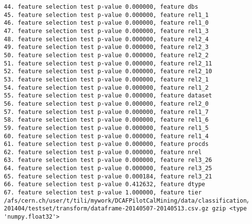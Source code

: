 \begin{verbatim}
44. feature selection test p-value 0.000000, feature dbs
45. feature selection test p-value 0.000000, feature rel1_1
46. feature selection test p-value 0.000000, feature rel1_0
47. feature selection test p-value 0.000000, feature rel1_3
48. feature selection test p-value 0.000000, feature rel2_4
49. feature selection test p-value 0.000000, feature rel2_3
50. feature selection test p-value 0.000000, feature rel2_2
51. feature selection test p-value 0.000000, feature rel2_11
52. feature selection test p-value 0.000000, feature rel2_10
53. feature selection test p-value 0.000000, feature rel2_1
54. feature selection test p-value 0.000000, feature rel1_2
55. feature selection test p-value 0.000000, feature dataset
56. feature selection test p-value 0.000000, feature rel2_0
57. feature selection test p-value 0.000000, feature rel1_7
58. feature selection test p-value 0.000000, feature rel1_6
59. feature selection test p-value 0.000000, feature rel1_5
60. feature selection test p-value 0.000000, feature rel1_4
61. feature selection test p-value 0.000000, feature procds
62. feature selection test p-value 0.000000, feature nrel
63. feature selection test p-value 0.000000, feature rel3_26
64. feature selection test p-value 0.000000, feature rel3_25
65. feature selection test p-value 0.000184, feature rel3_21
66. feature selection test p-value 0.412632, feature dtype
67. feature selection test p-value 1.000000, feature tier
/afs/cern.ch/user/t/tili/mywork/DCAFPilotCalMining/data/classification/tier2/tier2_201305-201404/testset/transform/dataframe-20140507-20140513.csv.gz gzip <type 'numpy.float32'>


\end{verbatim}
